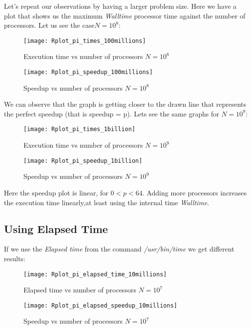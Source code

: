 \documentclass[11pt]{scrartcl} %
\begin{document}
Let's repeat our observations by having a larger problem size.
Here we have a plot that shows us the maximum \textit{Walltime} processor time against the number of processors. Let us see the case$ N=10^8$:
\begin{figure}[H] 
	\centering
	\texttt{[image: Rplot\_pi\_times\_100millions]} %
	\caption{Execution time vs number of processors $N= 10^8$}
\end{figure}
\begin{figure}[H] %
	\centering
	\texttt{[image: Rplot\_pi\_speedup\_100millions]} %
	\caption{Speedup vs number of processors $N=10^8$}
\end{figure}
We can observe that the graph is getting closer to the drawn line that represents the perfect speedup (that is speedup = p).
Lets see the same graphs for $N=10^9$:
\begin{figure}[H] %
	\centering
	\texttt{[image: Rplot\_pi\_times\_1billion]} %
	\caption{ Execution time vs number of processors $N= 10^9$}
\end{figure}
\begin{figure}[H] %
	\centering
	\texttt{[image: Rplot\_pi\_speedup\_1billion]} %
	\caption{ Speedup vs number of processors $N= 10^9$}
\end{figure}
Here the speedup plot is linear, for $0 < p < 64$. Adding more processors increases the execution time linearly,at least using the internal time \textit{Walltime}.
\subsection{Using Elapsed Time}
If we use the \textit{Elapsed time} from the command \textit{/usr/bin/time} we get different results:

\begin{figure}[H] %
	\centering
	\texttt{[image: Rplot\_pi\_elapsed\_time\_10millions]} %
	\caption{Elapsed time vs number of processors $N= 10^7$}
\end{figure}
\begin{figure}[H] %
	\centering
	\texttt{[image: Rplot\_pi\_elapsed\_speedup\_10millions]} %
	\caption{Speedup vs number of processors $N= 10^7$}
\end{figure}
\end{document}
